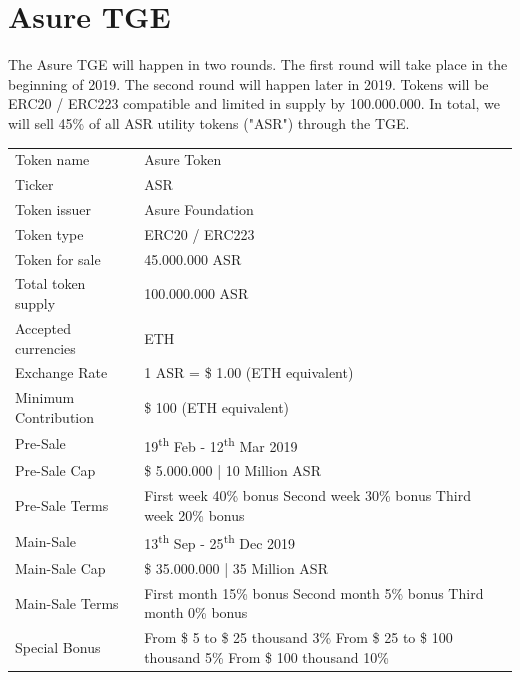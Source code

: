 \section{Asure TGE}

The Asure TGE will happen in two rounds. The first round will take place in the beginning of 2019. The second round will happen later in 2019. Tokens will be ERC20 / ERC223 compatible and limited in supply by 100.000.000. In total, we will sell 45\% of all ASR utility tokens ("ASR") through the TGE. 

\begin{table}[H]
\begin{tabular}{lp{}l}
  Token name & Asure Token \\  
  Ticker & ASR\\
  Token issuer & Asure Foundation\\
  Token type & ERC20 / ERC223 \\
  Token for sale & 45.000.000 ASR \\
  Total token supply & 100.000.000 ASR \\
  Accepted currencies & ETH \\
  Exchange Rate & 1 ASR = \$ 1.00 (ETH equivalent) \\
  Minimum Contribution & \$ 100 (ETH equivalent) \\\hline  
 
  Pre-Sale & 19\textsuperscript{th} Feb - 12\textsuperscript{th} Mar 2019 \\
  Pre-Sale Cap & \$ 5.000.000 | 10 Million ASR\\
  Pre-Sale Terms & First week 40\% bonus\newline
                   Second week 30\% bonus\newline
                   Third week 20\%  bonus\\\hline
  
  Main-Sale & 13\textsuperscript{th} Sep - 25\textsuperscript{th} Dec 2019 \\  
  Main-Sale Cap & \$ 35.000.000 | 35 Million ASR\\
  Main-Sale Terms & First month 15\% bonus\newline
                    Second month 5\% bonus\newline
                    Third month 0\% bonus\\\hline

  Special Bonus & 
From \$ 5 to \$ 25 thousand  3\%\newline
From \$ 25 to \$ 100 thousand  5\%\newline
From \$ 100 thousand 10\%\\\hline


\end{tabular}
\end{table}
